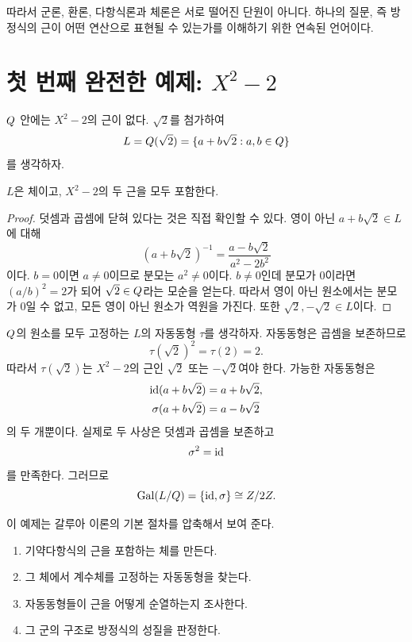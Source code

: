 따라서 군론, 환론, 다항식론과 체론은 서로 떨어진 단원이 아니다. 하나의 질문, 즉 방정식의 근이 어떤 연산으로 표현될 수 있는가를 이해하기 위한 연속된 언어이다.

\section{첫 번째 완전한 예제: \texorpdfstring{$X^2-2$}{X squared minus 2}}

$Q$ 안에는 $X^2-2$의 근이 없다. $\sqrt2$를 첨가하여
\[
  L=Q(\sqrt2)=\{a+b\sqrt2:a,b\in Q\}
\]
를 생각하자.

\begin{proposition}
$L$은 체이고, $X^2-2$의 두 근을 모두 포함한다.
\end{proposition}

\begin{proof}
덧셈과 곱셈에 닫혀 있다는 것은 직접 확인할 수 있다. 영이 아닌 $a+b\sqrt2\in L$에 대해
\[
  (a+b\sqrt2)^{-1}
  =\frac{a-b\sqrt2}{a^2-2b^2}
\]
이다. $b=0$이면 $a\ne0$이므로 분모는 $a^2\ne0$이다. $b\ne0$인데 분모가 $0$이라면 $(a/b)^2=2$가 되어 $\sqrt2\in Q$라는 모순을 얻는다. 따라서 영이 아닌 원소에서는 분모가 $0$일 수 없고, 모든 영이 아닌 원소가 역원을 가진다. 또한 $\sqrt2,-\sqrt2\in L$이다.
\end{proof}

$Q$의 원소를 모두 고정하는 $L$의 자동동형 $\tau$를 생각하자. 자동동형은 곱셈을 보존하므로
\[
  \tau(\sqrt2)^2=\tau(2)=2.
\]
따라서 $\tau(\sqrt2)$는 $X^2-2$의 근인 $\sqrt2$ 또는 $-\sqrt2$여야 한다. 가능한 자동동형은
\[
\begin{aligned}
  \operatorname{id}(a+b\sqrt2)&=a+b\sqrt2,\\
  \sigma(a+b\sqrt2)&=a-b\sqrt2
\end{aligned}
\]
의 두 개뿐이다. 실제로 두 사상은 덧셈과 곱셈을 보존하고
\[
  \sigma^2=\operatorname{id}
\]
를 만족한다. 그러므로
\[
  \operatorname{Gal}(L/Q)=\{\operatorname{id},\sigma\}\cong Z/2Z.
\]

이 예제는 갈루아 이론의 기본 절차를 압축해서 보여 준다.

\begin{enumerate}
  \item 기약다항식의 근을 포함하는 체를 만든다.
  \item 그 체에서 계수체를 고정하는 자동동형을 찾는다.
  \item 자동동형들이 근을 어떻게 순열하는지 조사한다.
  \item 그 군의 구조로 방정식의 성질을 판정한다.
\end{enumerate}

